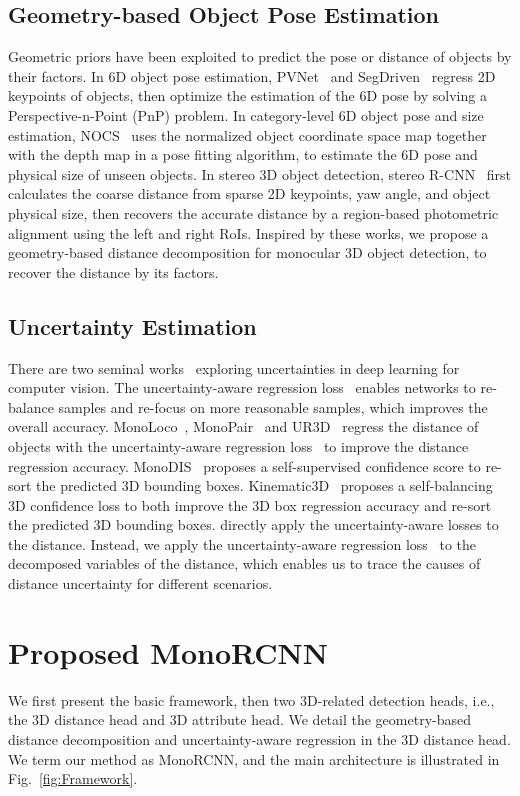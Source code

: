 \documentclass[10pt,twocolumn,letterpaper]{article}
\begin{document}
\subsection{Geometry-based Object Pose Estimation}
Geometric priors have been exploited to predict the pose or distance of objects by their factors. In 6D object pose estimation, PVNet~\cite{DBLP:conf/cvpr/PengLHZB19} and SegDriven~\cite{DBLP:conf/cvpr/HuHFS19} regress 2D keypoints of objects, then optimize the estimation of the 6D pose by solving a Perspective-n-Point (PnP) problem. In category-level
6D object pose and size estimation, NOCS~\cite{DBLP:conf/cvpr/Wang0HVSG19} uses the normalized object coordinate space map together with the depth
map in a pose fitting algorithm, to estimate the 6D pose and physical size of unseen objects. In stereo 3D object detection, stereo R-CNN~\cite{DBLP:conf/cvpr/0001CS19} first calculates the coarse distance from sparse 2D keypoints, yaw angle, and object physical size, then recovers the accurate distance by a region-based photometric alignment using the left and right RoIs. Inspired by these works, we propose a geometry-based distance decomposition for monocular 3D object detection, to recover the distance by its factors.

\subsection{Uncertainty Estimation}
There are two seminal works~\cite{DBLP:conf/nips/KendallG17,DBLP:conf/cvpr/KendallGC18} exploring uncertainties in deep learning for computer vision. The uncertainty-aware regression loss~\cite{DBLP:conf/cvpr/KendallGC18} enables networks to re-balance samples and re-focus on more reasonable samples, which improves the overall accuracy. MonoLoco~\cite{DBLP:conf/iccv/BertoniKA19}, MonoPair~\cite{DBLP:conf/cvpr/ChenTSL20} and UR3D~\cite{DBLP:conf/eccv/ShiCK20} regress the distance of objects with the uncertainty-aware regression loss~\cite{DBLP:conf/cvpr/KendallGC18} to improve the distance regression accuracy. MonoDIS~\cite{DBLP:conf/iccv/SimonelliBPLK19} proposes a self-supervised confidence score to re-sort the predicted 3D bounding boxes. Kinematic3D~\cite{DBLP:conf/eccv/BrazilPLS20} proposes a self-balancing 3D confidence loss to both improve the 3D box regression accuracy and re-sort the predicted 3D bounding boxes. \cite{DBLP:conf/iccv/BertoniKA19,DBLP:conf/cvpr/ChenTSL20,DBLP:conf/eccv/ShiCK20,DBLP:conf/iccv/SimonelliBPLK19,DBLP:conf/eccv/BrazilPLS20} directly apply the uncertainty-aware losses to the distance. Instead, we apply the uncertainty-aware regression loss~\cite{DBLP:conf/cvpr/KendallGC18} to the decomposed variables of the distance, which enables us to trace the causes of distance uncertainty for different scenarios.  \section{Proposed MonoRCNN}
We first present the basic framework, then two 3D-related detection heads, i.e., the 3D distance head and 3D attribute head. We detail the geometry-based distance decomposition and uncertainty-aware regression in the 3D distance head. We term our method as MonoRCNN, and the main architecture is illustrated in Fig.~\ref{fig:Framework}.
\end{document}
